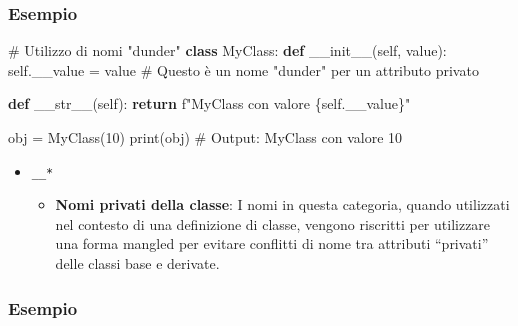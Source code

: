\documentclass[
  letterpaper,
  DIV=11,
  numbers=noendperiod]{scrreprt}
\newenvironment{Shaded}{\begin{snugshade}}{\end{snugshade}}
\newcommand{\BuiltInTok}[1]{\textcolor[rgb]{0.00,0.23,0.31}{#1}}
\newcommand{\CommentTok}[1]{\textcolor[rgb]{0.37,0.37,0.37}{#1}}
\newcommand{\ControlFlowTok}[1]{\textcolor[rgb]{0.00,0.23,0.31}{\textbf{#1}}}
\newcommand{\DecValTok}[1]{\textcolor[rgb]{0.68,0.00,0.00}{#1}}
\newcommand{\FunctionTok}[1]{\textcolor[rgb]{0.28,0.35,0.67}{#1}}
\newcommand{\KeywordTok}[1]{\textcolor[rgb]{0.00,0.23,0.31}{\textbf{#1}}}
\newcommand{\NormalTok}[1]{\textcolor[rgb]{0.00,0.23,0.31}{#1}}
\newcommand{\OperatorTok}[1]{\textcolor[rgb]{0.37,0.37,0.37}{#1}}
\newcommand{\SpecialCharTok}[1]{\textcolor[rgb]{0.37,0.37,0.37}{#1}}
\newcommand{\SpecialStringTok}[1]{\textcolor[rgb]{0.13,0.47,0.30}{#1}}
\newcommand{\VariableTok}[1]{\textcolor[rgb]{0.07,0.07,0.07}{#1}}
\providecommand{\tightlist}{%
  \setlength{\itemsep}{0pt}\setlength{\parskip}{0pt}}\usepackage{longtable,booktabs,array}
\begin{document}
\subsubsection{Esempio}\label{esempio-2}

\begin{Shaded}
\begin{Highlighting}[]
\CommentTok{\# Utilizzo di nomi "dunder"}
\KeywordTok{class}\NormalTok{ MyClass:}
    \KeywordTok{def} \FunctionTok{\_\_init\_\_}\NormalTok{(}\VariableTok{self}\NormalTok{, value):}
        \VariableTok{self}\NormalTok{.\_\_value }\OperatorTok{=}\NormalTok{ value  }\CommentTok{\# Questo è un nome "dunder" per un attributo privato}
    
    \KeywordTok{def} \FunctionTok{\_\_str\_\_}\NormalTok{(}\VariableTok{self}\NormalTok{):}
        \ControlFlowTok{return} \SpecialStringTok{f"MyClass con valore }\SpecialCharTok{\{}\VariableTok{self}\SpecialCharTok{.}\NormalTok{\_\_value}\SpecialCharTok{\}}\SpecialStringTok{"}

\NormalTok{obj }\OperatorTok{=}\NormalTok{ MyClass(}\DecValTok{10}\NormalTok{)}
\BuiltInTok{print}\NormalTok{(obj)  }\CommentTok{\# Output: MyClass con valore 10}
\end{Highlighting}
\end{Shaded}

\begin{itemize}
\tightlist
\item
  \texttt{\_\_*}

  \begin{itemize}
  \tightlist
  \item
    \textbf{Nomi privati della classe}: I nomi in questa categoria,
    quando utilizzati nel contesto di una definizione di classe, vengono
    riscritti per utilizzare una forma mangled per evitare conflitti di
    nome tra attributi ``privati'' delle classi base e derivate.
  \end{itemize}
\end{itemize}

\subsubsection{Esempio}\label{esempio-3}
\end{document}
